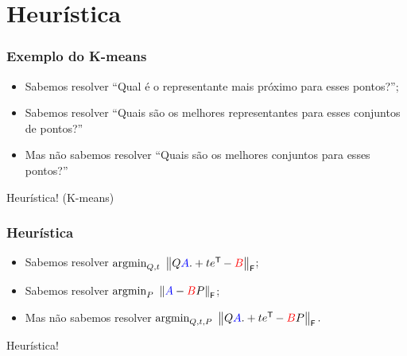 
\section{Heurística}

\begin{frame}
  \frametitle{Exemplo do K-means}
  \begin{itemize}
    \item Sabemos resolver ``Qual é o representante mais próximo para esses pontos?''; \vspace{1cm}
    \item Sabemos resolver ``Quais são os melhores representantes para esses conjuntos de pontos?'' \vspace{1cm}
    \item Mas não sabemos resolver ``Quais são os melhores conjuntos para esses pontos?''
  \end{itemize}
  \vspace{1cm}
  \begin{center}
    Heurística! (K-means)
  \end{center}
\end{frame}

\begin{frame}[fragile]
  \frametitle{Heurística}
  \begin{itemize}
    \item Sabemos resolver $\text{argmin}_{Q,t}\,\, \left\lVert Q\textcolor{blue}{A} .+ t e^{\mathsf{T}\mkern-1mu} - \textcolor{red}{B}\right\rVert_\mathsf{F}$; \vspace{1cm}
    \item Sabemos resolver $\text{argmin}_{P}\,\, \left\lVert\textcolor{blue}{A} - \textcolor{red}{B}P\right\rVert_\mathsf{F}$; \vspace{1cm}
    \item Mas não sabemos resolver $\text{argmin}_{Q,t,P}\,\, \left\lVert Q\textcolor{blue}{A} .+ t e^{\mathsf{T}\mkern-1mu} - \textcolor{red}{B}P\right\rVert_\mathsf{F}.$
  \end{itemize}
  \vspace{1cm}
  \begin{center}
    Heurística!
  \end{center}
\end{frame}

